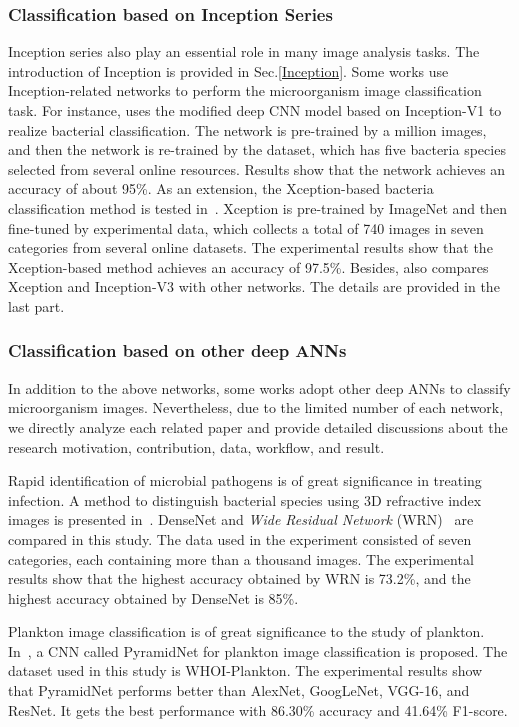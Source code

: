 \subsubsection{Classification based on Inception Series}
Inception series also play an essential role in many image analysis tasks. The introduction of Inception is provided in Sec.\ref{Inception}. Some works use Inception-related networks to perform the microorganism image classification task. For instance, \cite{Wahid-2018-CMIB} uses the modified deep CNN model based on Inception-V1 to realize bacterial classification. The network is pre-trained by a million images, and then the network is re-trained by the dataset, which has five bacteria species selected from several online resources. Results show that the network achieves an accuracy of about 95\%. As an extension, the Xception-based bacteria classification method is tested in~\cite{Wahid-2019-DCNN}. Xception is pre-trained by ImageNet and then fine-tuned by experimental data, which collects a total of 740 images in seven categories from several online datasets. The experimental results show that the Xception-based method achieves an accuracy of 97.5\%.  Besides, \cite{Zawadzki-2020-DLAC} also compares Xception and Inception-V3 with other networks. The details are provided in the last part.


\subsubsection{Classification based on other deep ANNs}
In addition to the above networks, some works adopt other deep ANNs to classify microorganism images. Nevertheless, due to the limited number of each network, we directly analyze each related paper and provide detailed discussions about the research motivation, contribution, data, workflow, and result.

Rapid identification of microbial pathogens is of great significance in treating infection. A method to distinguish bacterial species using 3D  refractive index images is presented in~\cite{Kim-2018-AIBU}. DenseNet and \emph{Wide Residual Network} (WRN)~\cite{Zagoruyko-2016-WRN} are compared in this study. The data used in the experiment consisted of seven categories, each containing more than a thousand images. The experimental results show that the highest accuracy obtained by WRN is 73.2\%, and the highest accuracy obtained by DenseNet is 85\%.

Plankton image classification is of great significance to the study of plankton. In~\cite{Liu-2018-DPRN}, a CNN called PyramidNet for plankton image classification is proposed. The dataset used in this study is WHOI-Plankton. The experimental results show that PyramidNet performs better than AlexNet, GoogLeNet, VGG-16, and ResNet. It gets the best performance with 86.30\% accuracy and 41.64\% F1-score.

